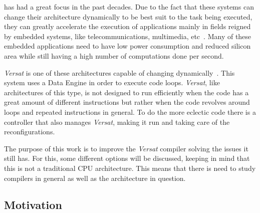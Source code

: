 \documentclass[journal]{IEEEtran}
\begin{document}
 has had a great focus
in the past decades.
Due to the fact that these systems can change their architecture dynamically to
be best suit to the task being executed, they can greatly accelerate the
execution of applications mainly in fields reigned by embedded systems, like
telecommunications, multimedia, etc~\cite{Carta06,Liu15,Lee18TACO}.
Many of these embedded applications need to have low power consumption and
reduced silicon area while still having a high number of computations done per second.

{\it Versat} is one of these architectures capable of changing
dynamically~\cite{Lopes16}.  This system uses a Data Engine in order to execute
code loops. {\it Versat}, like architectures of this type, is not designed to
run efficiently when the code has a great amount of different instructions but
rather when the code revolves around loops and repeated instructions in general.
To do the more eclectic code there is a controller that also manages {\it
Versat}, making it run and taking care of the reconfigurations.

The purpose of this work is to improve the {\it Versat} compiler solving the
issues it still has. For this, some different options will be discussed, keeping
in mind that this is not a traditional CPU architecture. This means that there
is need to study compilers in general as well as the architecture in question.

\subsection{Motivation}
\label{section:motiva}
\end{document}

